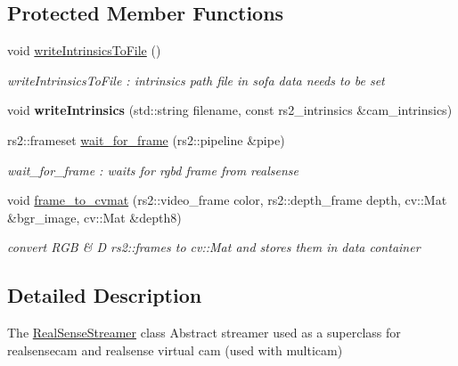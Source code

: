 \subsection*{Protected Member Functions}
\begin{DoxyCompactItemize}
\item 
\mbox{\label{classsofa_1_1rgbdtracking_1_1_real_sense_streamer_a1db9130e1444a18c5a5a3f19e8dc32da}} 
void \hyperlink{classsofa_1_1rgbdtracking_1_1_real_sense_streamer_a1db9130e1444a18c5a5a3f19e8dc32da}{write\+Intrinsics\+To\+File} ()
\begin{DoxyCompactList}\small\item\em write\+Intrinsics\+To\+File \+: intrinsics path file in sofa data needs to be set \end{DoxyCompactList}\item 
\mbox{\label{classsofa_1_1rgbdtracking_1_1_real_sense_streamer_ae7f7303c5cc323868d3bcc36d13c8689}} 
void {\bfseries write\+Intrinsics} (std\+::string filename, const rs2\+\_\+intrinsics \&cam\+\_\+intrinsics)
\item 
rs2\+::frameset \hyperlink{classsofa_1_1rgbdtracking_1_1_real_sense_streamer_a3ea622968695865d727d67b72e8363c7}{wait\+\_\+for\+\_\+frame} (rs2\+::pipeline \&pipe)
\begin{DoxyCompactList}\small\item\em wait\+\_\+for\+\_\+frame \+: waits for rgbd frame from realsense \end{DoxyCompactList}\item 
\mbox{\label{classsofa_1_1rgbdtracking_1_1_real_sense_streamer_aac7fbd7301db4731d78aaf89a2022a01}} 
void \hyperlink{classsofa_1_1rgbdtracking_1_1_real_sense_streamer_aac7fbd7301db4731d78aaf89a2022a01}{frame\+\_\+to\+\_\+cvmat} (rs2\+::video\+\_\+frame color, rs2\+::depth\+\_\+frame depth, cv\+::\+Mat \&bgr\+\_\+image, cv\+::\+Mat \&depth8)
\begin{DoxyCompactList}\small\item\em convert R\+GB \& D rs2\+::frames to cv\+::\+Mat and stores them in data container \end{DoxyCompactList}\end{DoxyCompactItemize}


\subsection{Detailed Description}
The \hyperlink{classsofa_1_1rgbdtracking_1_1_real_sense_streamer}{Real\+Sense\+Streamer} class Abstract streamer used as a superclass for realsensecam and realsense virtual cam (used with multicam) 

